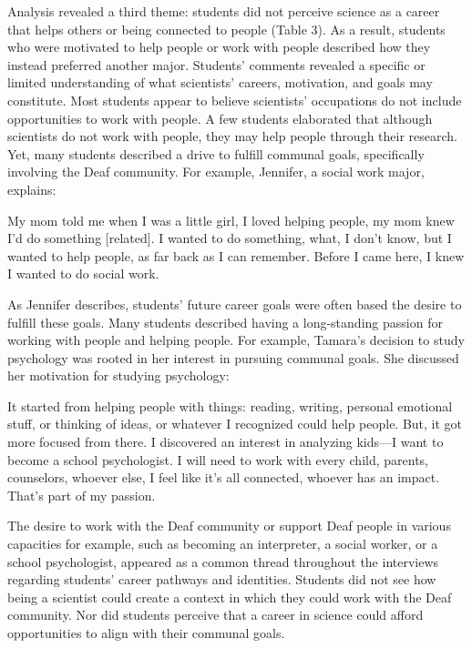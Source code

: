 \documentclass[11.5pt]{sig-alternate} %
\begin{document}
\begin{large}
Analysis revealed a third theme: students did not perceive science as a career that helps others or being connected to people (Table 3). As a result, students who were motivated to help people or work with people described how they instead preferred another major. Students’ comments revealed a specific or limited understanding of what scientists’ careers, motivation, and goals may constitute. Most students appear to believe scientists’ occupations do not include opportunities to work with people. A few students elaborated that although scientists do not work with people, they may help people through their research. Yet, many students described a drive to fulfill communal goals, specifically involving the Deaf community. For example, Jennifer, a social work major, explains:

My mom told me when I was a little girl, I loved helping people, my mom knew I'd do something [related]. I wanted to do something, what, I don't know, but I wanted to help people, as far back as I can remember. Before I came here, I knew I wanted to do social work. 

As Jennifer describes, students’ future career goals were often based the desire to fulfill these goals. Many students described having a long-standing passion for working with people and helping people. For example, Tamara’s decision to study psychology was rooted in her interest in pursuing communal goals. She discussed her motivation for studying psychology:

It started from helping people with things: reading, writing, personal emotional stuff, or thinking of ideas, or whatever I recognized could help people. But, it got more focused from there. I discovered an interest in analyzing kids—I want to become a school psychologist. I will need to work with every child, parents, counselors, whoever else, I feel like it's all connected, whoever has an impact. That's part of my passion.

The desire to work with the Deaf community or support Deaf people in various capacities for example, such as becoming an interpreter, a social worker, or a school psychologist, appeared as a common thread throughout the interviews regarding students’ career pathways and identities. Students did not see how being a scientist could create a context in which they could work with the Deaf community. Nor did students perceive that a career in science could afford opportunities to align with their communal goals. 


\end{large}
\end{document}
